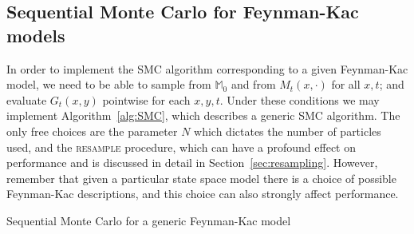 \subsection{Sequential Monte Carlo for Feynman-Kac models}

In order to implement the SMC algorithm corresponding to a given Feynman-Kac model, we need to be able to sample from $\mathbb{M}_0$ and from $M_t(x, \cdot)$ for all $x,t$; and evaluate $G_t(x, y)$ pointwise for each $x,y, t$.
Under these conditions we may implement Algorithm~\ref{alg:SMC}, which describes a generic SMC algorithm. 
The only free choices are the parameter $N$ which dictates the number of particles used, and the \textsc{resample} procedure, which can have a profound effect on performance and is discussed in detail in Section~\ref{sec:resampling}.
However, remember that given a particular state space model there is a choice of possible Feynman-Kac descriptions, and this choice can also strongly affect performance.


\vspace{10pt}
\begin{algorithm}
\DontPrintSemicolon
{}
\caption{Sequential Monte Carlo for a generic Feynman-Kac model}
\label{alg:SMC}
\end{algorithm}
\vspace{10pt}

